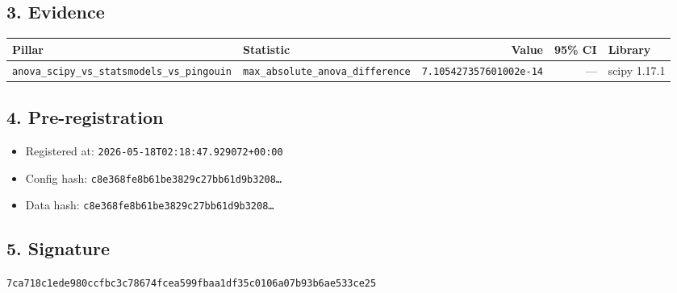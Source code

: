 \documentclass{article}
\begin{document}
\subsection*{3. Evidence}
\begin{tabular}{llrrl}\toprule
\textbf{Pillar} & \textbf{Statistic} & \textbf{Value} & \textbf{95\% CI} & \textbf{Library} \\\midrule
\texttt{anova\_scipy\_vs\_statsmodels\_vs\_pingouin} & \texttt{max\_absolute\_anova\_difference} & \texttt{7.105427357601002e-14} & --- & scipy 1.17.1 \\
\bottomrule\end{tabular}
\subsection*{4. Pre-registration}
\begin{itemize}
\item Registered at: \texttt{2026-05-18T02:18:47.929072+00:00}
\item Config hash: \texttt{c8e368fe8b61be3829c27bb61d9b3208\dots}
\item Data hash: \texttt{c8e368fe8b61be3829c27bb61d9b3208\dots}
\end{itemize}
\subsection*{5. Signature}
\texttt{7ca718c1ede980ccfbc3c78674fcea599fbaa1df35c0106a07b93b6ae533ce25}\\
\end{document}
